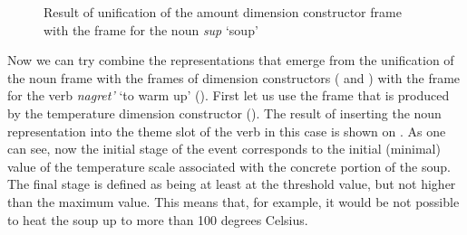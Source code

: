 \begin{figure}
\centering
{}
\caption{Result of unification of the amount dimension constructor frame with the frame for the noun \textit{sup} `soup' \label{frame:soup:amount}}
\end{figure}

Now we can try combine the representations that emerge from the unification of the noun frame with the  frames of dimension constructors ( and ) with the frame for the verb \textit{nagret'} `to warm up' (). First let us use the frame that is produced by the temperature dimension constructor (). The result of inserting the noun representation into the theme slot of the verb in this case is shown on . As one can see, now the initial stage of the event corresponds to the initial (minimal) value of the temperature scale associated with the concrete portion of the soup. The final stage is defined as being at least at the threshold value, but not higher than the maximum value. This means that, for example, it would be not possible to heat the soup up to more than 100 degrees Celsius. 

